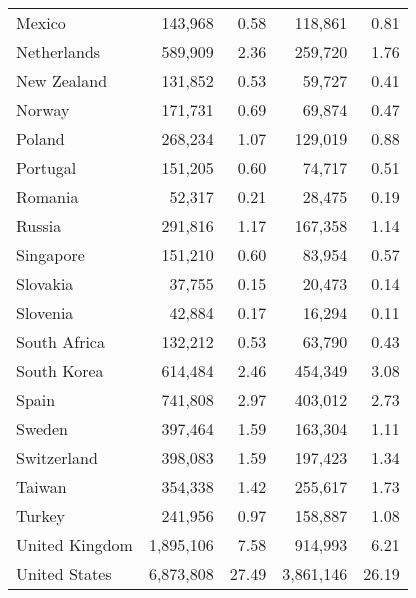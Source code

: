 \begin{tabular}{lrrrr}
Mexico         &   143,968 &         0.58 &   118,861 &         0.81 \\
Netherlands    &   589,909 &         2.36 &   259,720 &         1.76 \\
New Zealand    &   131,852 &         0.53 &    59,727 &         0.41 \\
Norway         &   171,731 &         0.69 &    69,874 &         0.47 \\
Poland         &   268,234 &         1.07 &   129,019 &         0.88 \\
Portugal       &   151,205 &         0.60 &    74,717 &         0.51 \\
Romania        &    52,317 &         0.21 &    28,475 &         0.19 \\
Russia         &   291,816 &         1.17 &   167,358 &         1.14 \\
Singapore      &   151,210 &         0.60 &    83,954 &         0.57 \\
Slovakia       &    37,755 &         0.15 &    20,473 &         0.14 \\
Slovenia       &    42,884 &         0.17 &    16,294 &         0.11 \\
South Africa   &   132,212 &         0.53 &    63,790 &         0.43 \\
South Korea    &   614,484 &         2.46 &   454,349 &         3.08 \\
Spain          &   741,808 &         2.97 &   403,012 &         2.73 \\
Sweden         &   397,464 &         1.59 &   163,304 &         1.11 \\
Switzerland    &   398,083 &         1.59 &   197,423 &         1.34 \\
Taiwan         &   354,338 &         1.42 &   255,617 &         1.73 \\
Turkey         &   241,956 &         0.97 &   158,887 &         1.08 \\
United Kingdom & 1,895,106 &         7.58 &   914,993 &         6.21 \\
United States  & 6,873,808 &        27.49 & 3,861,146 &        26.19 \\
\bottomrule
\end{tabular}
